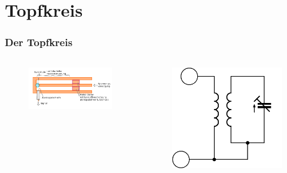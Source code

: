 \section*{Topfkreis}
\begin{frame}
  \frametitle{Der Topfkreis}
  \begin{columns}
    \begin{figure}
      \includegraphics[width=\textwidth,height=.25\textheight,keepaspectratio]{a10/500px-Topfkreis.png}
    \end{figure}
    \begin{figure}
      \includegraphics[width=\textwidth,height=.25\textheight,keepaspectratio]{a10/Topfkreis-ESB.png}

\end{figure}
\end{columns}
\end{frame}
